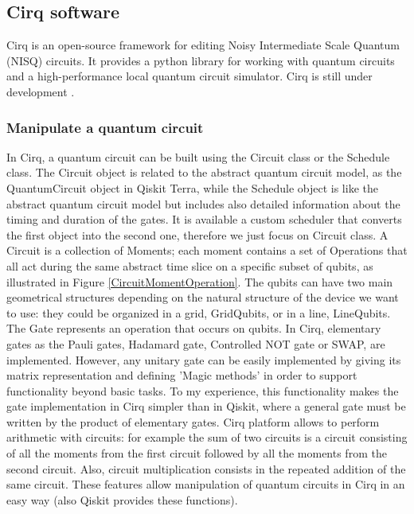 \subsection{Cirq software}
 \label{Cirq_section}
Cirq is an open-source framework for editing Noisy Intermediate Scale Quantum (NISQ) circuits. It provides a python library for working with quantum circuits and a high-performance local quantum circuit simulator.
Cirq is still under development \cite{DocumentationCirq}.


\subsubsection{Manipulate a quantum circuit}

In Cirq, a quantum circuit can be built using the {\selectfont Circuit} class or the  {\selectfont Schedule} class. The {\selectfont Circuit} object is related to the abstract quantum circuit model, as the {\selectfont QuantumCircuit} object in Qiskit Terra, while the {\selectfont Schedule}  object is like the abstract quantum circuit model but includes also detailed information about the timing and duration of the gates. It is available a custom scheduler that converts the first object into the second one, therefore we just  focus on {\selectfont Circuit} class. A {\selectfont Circuit} is a collection of {\selectfont Moments}; each moment contains a set of {\selectfont Operations} that all act during the same abstract time slice on a specific subset of qubits, as illustrated in Figure \ref{CircuitMomentOperation}. 
The qubits can have two main geometrical structures depending on the natural structure of the device we want to use: they could be organized in a grid, {\selectfont GridQubits}, or in a line, {\selectfont LineQubits}. 
The {\selectfont Gate} represents an operation that occurs on qubits. In Cirq, elementary gates as the Pauli gates, Hadamard gate, Controlled NOT gate or SWAP, are implemented. 
However, any unitary gate can be easily implemented by giving its matrix representation and defining 'Magic methods' in order to support functionality beyond basic tasks. 
To my experience, this functionality makes the gate implementation in Cirq simpler than in Qiskit, where a general gate must be written by the product of elementary gates. 
Cirq platform allows to perform arithmetic with circuits: for example the sum of two circuits is a circuit consisting of all the moments from the first circuit followed by all the moments from the second circuit. Also, circuit multiplication consists in the repeated addition of the same circuit. These features allow manipulation of quantum circuits in Cirq in an easy way (also Qiskit provides these functions).

